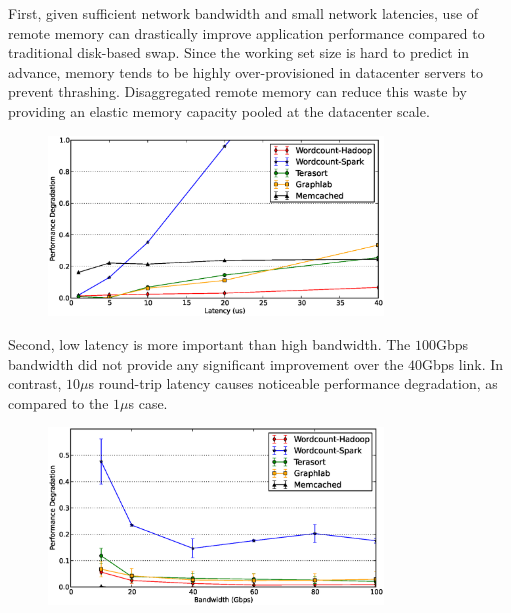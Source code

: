 First, given sufficient network bandwidth and small network latencies, use of remote memory can drastically improve application performance compared to traditional disk-based swap. Since the working set size is hard to predict in advance, memory tends to be highly over-provisioned in datacenter servers to prevent thrashing. Disaggregated remote memory can reduce this waste by providing an elastic memory capacity pooled at the datacenter scale. 

%
\begin{figure}
  \centering
    \includegraphics[width = 3.5in]{img/fix_bw_vary_latency.eps} 
  \caption{\small{}}
  \label{fig:impl}
\end{figure}
%
Second, low latency is more important than high bandwidth. The $100$Gbps bandwidth did not provide any significant improvement over the $40$Gbps link. In contrast, $10\mu$s round-trip latency causes noticeable performance degradation, as compared to the $1\mu$s case.

%
\begin{figure}
  \centering
    \includegraphics[width = 3.5in]{img/fix_latency_vary_bw.eps} 
  \caption{\small{}}
  \label{fig:impb}
\end{figure}
%


